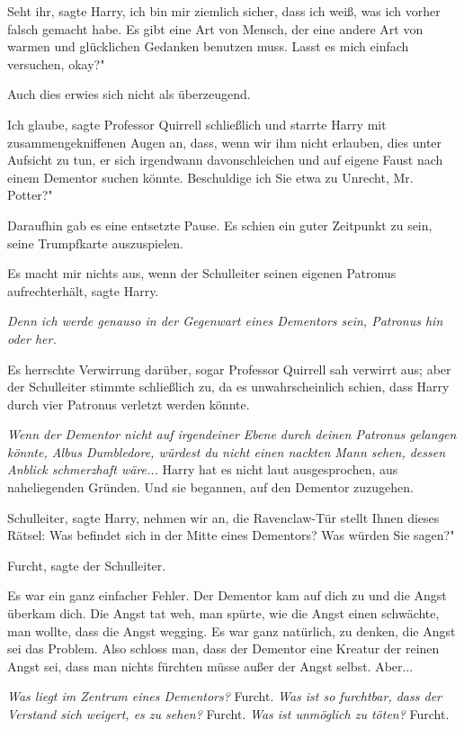 \glqq Seht ihr\grqq{}, sagte Harry, \glqq ich bin mir ziemlich sicher, dass ich
weiß, was ich vorher falsch gemacht habe. Es gibt eine Art von Mensch, der eine
andere Art von warmen und glücklichen Gedanken benutzen muss. Lasst es mich
einfach versuchen, okay?"

Auch dies erwies sich nicht als überzeugend.

\glqq Ich glaube\grqq{}, sagte Professor Quirrell schließlich und starrte Harry
mit zusammengekniffenen Augen an, \glqq dass, wenn wir ihm nicht erlauben, dies
unter Aufsicht zu tun, er sich irgendwann davonschleichen und auf eigene Faust
nach einem Dementor suchen könnte. Beschuldige ich Sie etwa zu Unrecht, Mr.
Potter?"

Daraufhin gab es eine entsetzte Pause. Es schien ein guter Zeitpunkt zu sein,
seine Trumpfkarte auszuspielen.

\glqq Es macht mir nichts aus, wenn der Schulleiter seinen eigenen Patronus
aufrechterhält\grqq{}, sagte Harry.

\emph{Denn ich werde genauso in der Gegenwart eines Dementors sein, Patronus hin oder her.}

Es herrschte Verwirrung darüber, sogar Professor Quirrell sah verwirrt aus; aber
der Schulleiter stimmte schließlich zu, da es unwahrscheinlich schien, dass
Harry durch vier Patronus verletzt werden könnte.

\emph{Wenn der Dementor nicht auf irgendeiner Ebene durch deinen Patronus gelangen könnte, Albus Dumbledore, würdest du nicht einen nackten Mann sehen, dessen Anblick schmerzhaft wäre...}
Harry hat es nicht laut ausgesprochen, aus naheliegenden Gründen. Und sie
begannen, auf den Dementor zuzugehen.

\glqq Schulleiter\grqq{}, sagte Harry, \glqq nehmen wir an, die Ravenclaw-Tür
stellt Ihnen dieses Rätsel: Was befindet sich in der Mitte eines Dementors? Was
würden Sie sagen?"

\glqq Furcht\grqq{}, sagte der Schulleiter.

Es war ein ganz einfacher Fehler. Der Dementor kam auf dich zu und die Angst
überkam dich. Die Angst tat weh, man spürte, wie die Angst einen schwächte, man
wollte, dass die Angst wegging. Es war ganz natürlich, zu denken, die Angst sei
das Problem. Also schloss man, dass der Dementor eine Kreatur der reinen Angst
sei, dass man nichts fürchten müsse außer der Angst selbst. Aber...

\emph{Was liegt im Zentrum eines Dementors?}
Furcht.
\emph{Was ist so furchtbar, dass der Verstand sich weigert, es zu sehen?}
Furcht.
\emph{ Was ist unmöglich zu töten?}
Furcht.

